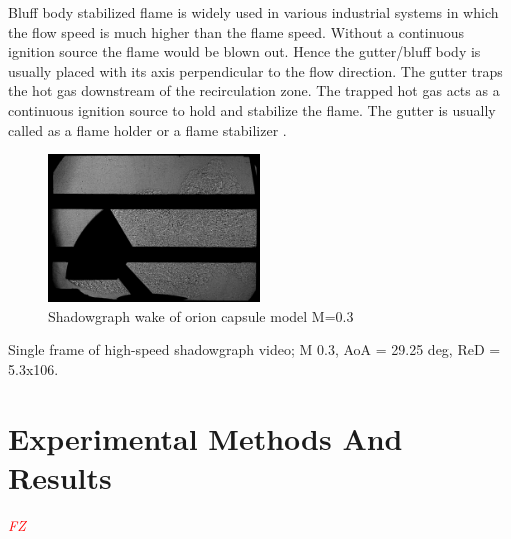 \documentclass[journal]{new-aiaa}
\begin{document}
Bluff body stabilized flame is widely used in various industrial systems in which the flow speed is much higher than the flame speed. Without a continuous ignition source the flame would be blown out. Hence the gutter/bluff body is usually placed with its axis perpendicular to the flow direction. The gutter traps the hot gas downstream of the recirculation zone. The trapped hot gas acts as a continuous ignition source to hold and stabilize the flame. The gutter is usually called as a flame holder or a flame stabilizer \cite{li2011large}.





\begin{figure}[H]
\begin{center}
\includegraphics[width=0.5\textwidth]{Images/logan/ross2013comprehensive_CapsuleWakeShadowgraph.pdf}
\caption{ Shadowgraph wake of orion capsule model M=0.3 \cite{ross2013comprehensive} }
\label{fig:orionwakeshadowgraph}
\end{center}
\end{figure}

Single frame of high-speed shadowgraph
video; M 0.3, AoA = 29.25 deg, ReD = 5.3x106.




\section{Experimental Methods And Results} \label{sec:experimentalmethods}

\textcolor{red}{\emph{FZ}}
\end{document}
